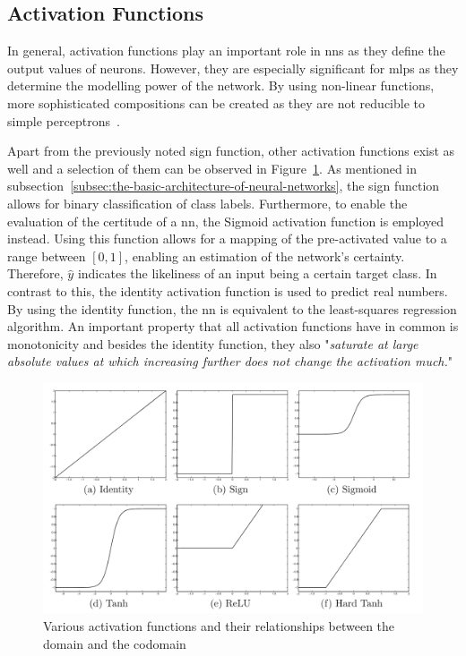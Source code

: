 \documentclass[draft,final]{vutinfth} %
\newcommand{\p}[1]{see p. #1}
\begin{document}
    \subsection{Activation Functions}
    In general, activation functions play an important role in \glspl{nn} as they define the output values of neurons.
    However, they are especially significant for \glspl{mlp} as they determine the modelling power of the network.
    By using non-linear functions, more sophisticated compositions can be created as they are not reducible to simple perceptrons~\citep[\p{13}]{aggarwal_neural_2018}.

    Apart from the previously noted sign function, other activation functions exist as well and a selection of them can be observed in Figure~\ref{fig:activation_functions}.
    As mentioned in subsection~\ref{subsec:the-basic-architecture-of-neural-networks}, the sign function allows for binary classification of class labels.
    Furthermore, to enable the evaluation of the certitude of a \gls{nn}, the Sigmoid activation function is employed instead.
    Using this function allows for a mapping of the pre-activated value to a range between $[0,1]$, enabling an estimation of the network's certainty.
    Therefore, $\hat{y}$ indicates the likeliness of an input being a certain target class.
    In contrast to this, the identity activation function is used to predict real numbers.
    By using the identity function, the \gls{nn} is equivalent to the least-squares regression algorithm.
    An important property that all activation functions have in common is monotonicity and besides the identity function, they also "\textit{saturate at large absolute values at which increasing further does not change the activation much.}"\citep[\p{13}]{aggarwal_neural_2018}

    \begin{figure}[h]
        \centering
        \includegraphics[width=\textwidth]{figures/various_activation_functions.png}
        \caption[Various activation functions and their relationships between the domain and the codomain]{Various activation functions and their relationships between the domain and the codomain\protect\footnotemark}
        \label{fig:activation_functions}
    \end{figure}
\end{document}
